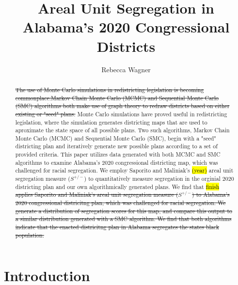 \documentclass{article}
\title{Areal Unit Segregation in Alabama's 2020 Congressional Districts }
\author{Rebecca Wagner}
\date{}
\begin{document}
\maketitle

\begin{abstract}
\st{The use of Monte Carlo simulations in redistricting legislation is becoming commonplace.Markov Chain Monte Carlo (MCMC) and Sequential Monte Carlo (SMC) algorithms both make use of graph theory to redraw districts based on either existing or "seed" plans.} Monte Carlo simulations have proved useful in redistricting legislation, where the simulation generates districting maps that are used to aproximate the state space of all possible plans. Two such algorithms, Markov Chain Monte Carlo (MCMC) and Sequential Monte Carlo (SMC), begin with a "seed" districting plan and iteratively generate new possible plans according to a set of provided criteria. This paper utilizes data generated with both MCMC and SMC algorithms to examine Alabama's 2020 congressional districting map, which was challenged for racial segregation. We employ Saporito and Maliniak's \hl{(year)} areal unit segregation measure ($S^{+/-}$) to quantitatively measure segregation in the orginial 2020 districting plan and our own algorithmically generated plans. We find that \hl{finish} \st{applies Saporito and Maliniak's areal unit segregation measure ($S^{+/-}$) to Alabama's 2020 congressional districitng plan, which was challenged for racial segregation. We generate a distribution of segregation scores for this map, and compare this output to a similar distribution generated with a SMC algorithm. We find that both algorithms indicate that the enacted districitng plan in Alabama segregates the states black population.}
\end{abstract}

\section{Introduction}
\end{document}
